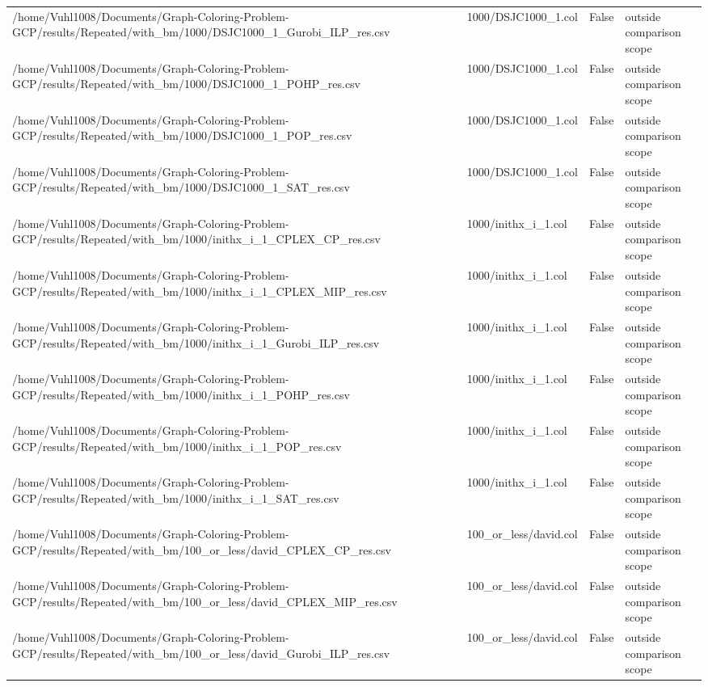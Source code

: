 \begin{table}[htbp]
\begin{tabular}{llll}
/home/Vuhl1008/Documents/Graph-Coloring-Problem-GCP/results/Repeated/with\_bm/1000/DSJC1000\_1\_Gurobi\_ILP\_res.csv & 1000/DSJC1000\_1.col & False & outside comparison scope \\
/home/Vuhl1008/Documents/Graph-Coloring-Problem-GCP/results/Repeated/with\_bm/1000/DSJC1000\_1\_POHP\_res.csv & 1000/DSJC1000\_1.col & False & outside comparison scope \\
/home/Vuhl1008/Documents/Graph-Coloring-Problem-GCP/results/Repeated/with\_bm/1000/DSJC1000\_1\_POP\_res.csv & 1000/DSJC1000\_1.col & False & outside comparison scope \\
/home/Vuhl1008/Documents/Graph-Coloring-Problem-GCP/results/Repeated/with\_bm/1000/DSJC1000\_1\_SAT\_res.csv & 1000/DSJC1000\_1.col & False & outside comparison scope \\
/home/Vuhl1008/Documents/Graph-Coloring-Problem-GCP/results/Repeated/with\_bm/1000/inithx\_i\_1\_CPLEX\_CP\_res.csv & 1000/inithx\_i\_1.col & False & outside comparison scope \\
/home/Vuhl1008/Documents/Graph-Coloring-Problem-GCP/results/Repeated/with\_bm/1000/inithx\_i\_1\_CPLEX\_MIP\_res.csv & 1000/inithx\_i\_1.col & False & outside comparison scope \\
/home/Vuhl1008/Documents/Graph-Coloring-Problem-GCP/results/Repeated/with\_bm/1000/inithx\_i\_1\_Gurobi\_ILP\_res.csv & 1000/inithx\_i\_1.col & False & outside comparison scope \\
/home/Vuhl1008/Documents/Graph-Coloring-Problem-GCP/results/Repeated/with\_bm/1000/inithx\_i\_1\_POHP\_res.csv & 1000/inithx\_i\_1.col & False & outside comparison scope \\
/home/Vuhl1008/Documents/Graph-Coloring-Problem-GCP/results/Repeated/with\_bm/1000/inithx\_i\_1\_POP\_res.csv & 1000/inithx\_i\_1.col & False & outside comparison scope \\
/home/Vuhl1008/Documents/Graph-Coloring-Problem-GCP/results/Repeated/with\_bm/1000/inithx\_i\_1\_SAT\_res.csv & 1000/inithx\_i\_1.col & False & outside comparison scope \\
/home/Vuhl1008/Documents/Graph-Coloring-Problem-GCP/results/Repeated/with\_bm/100\_or\_less/david\_CPLEX\_CP\_res.csv & 100\_or\_less/david.col & False & outside comparison scope \\
/home/Vuhl1008/Documents/Graph-Coloring-Problem-GCP/results/Repeated/with\_bm/100\_or\_less/david\_CPLEX\_MIP\_res.csv & 100\_or\_less/david.col & False & outside comparison scope \\
/home/Vuhl1008/Documents/Graph-Coloring-Problem-GCP/results/Repeated/with\_bm/100\_or\_less/david\_Gurobi\_ILP\_res.csv & 100\_or\_less/david.col & False & outside comparison scope \\

\end{tabular}
\end{table}
